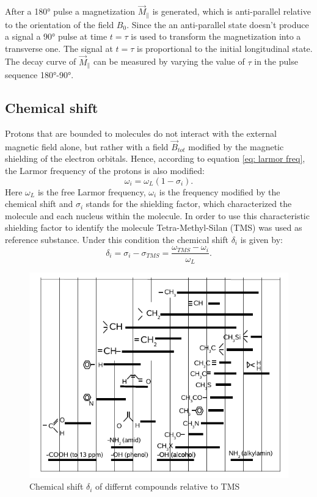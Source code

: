 After a 180° pulse a magnetization $\vec{M}_\parallel$ is generated, which is anti-parallel relative to the orientation of the field $B_0$. Since the an anti-parallel state doesn't produce a signal a 90° pulse at time $t = \tau$ is used to transform the magnetization into a transverse one. The signal at $t = \tau$ is proportional to the initial longitudinal state. The decay curve of $\vec{M}_\parallel$ can be measured by varying the value of $\tau$ in the pulse sequence 180°-90°. 
\subsection{Chemical shift}
Protons that are bounded to molecules do not interact with the external magnetic field alone, but rather with a field $\vec{B}_{tot}$ modified by the magnetic shielding of the electron orbitals. Hence, according to equation \ref{eq: larmor freq}, the Larmor frequency of the protons is also modified:
\begin{equation}
\omega_i = \omega_L\left( 1 - \sigma_i\right).
\end{equation}
Here $\omega_L$ is the free Larmor frequency, $\omega_i$ is the frequency modified by the chemical shift and $\sigma_i$ stands for the shielding factor, which characterized the molecule and each nucleus within the molecule.
In order to use this characteristic shielding factor to identify  the molecule Tetra-Methyl-Silan (TMS) was used as reference substance. Under this condition the chemical shift $\delta_i$ is given by:
\begin{equation}
\delta_i = \sigma_i - \sigma_{TMS} = \frac{\omega_{TMS} - \omega_i}{\omega_L}.
\end{equation}
\begin{figure}[!htbp]
 \begin{center}
  \includegraphics[width = .6\textwidth]{Latex images/chemical-shift.png}
  \caption[]{Chemical shift $\delta_i$ of differnt compounds relative to TMS \footnotemark}
    \label{fig: chemical shift}
 \end{center}
\end{figure}

